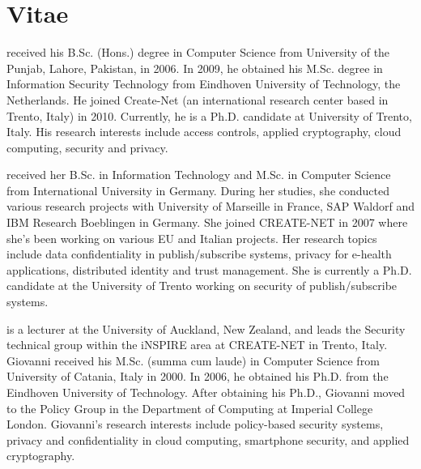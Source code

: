 \documentclass[final,5p,times,twocolumn]{elsarticle}
\begin{document}
\clearpage

\section*{Vitae}

  received his B.Sc. (Hons.) degree in Computer Science from University of the Punjab, Lahore, Pakistan, in 2006. In 2009, he obtained his M.Sc. degree in Information Security Technology from Eindhoven University of Technology, the Netherlands. He joined Create-Net (an international research center based in Trento, Italy) in 2010. Currently, he is a Ph.D. candidate at University of Trento, Italy. His research interests include access controls, applied cryptography, cloud computing, security and privacy.

 received her B.Sc. in Information Technology and M.Sc. in Computer Science from International University in Germany. During her studies, she conducted various research projects with University of Marseille in France, SAP Waldorf and IBM Research Boeblingen in Germany. She joined CREATE-NET in 2007 where she's been working on various EU and Italian projects. Her research topics include data confidentiality in publish/subscribe systems, privacy for e-health applications, distributed identity and trust management. She is currently a Ph.D. candidate at the University of Trento working on security of publish/subscribe systems.

 is a lecturer at the University of Auckland, New Zealand, and leads the Security technical group within the iNSPIRE area at CREATE-NET in Trento, Italy. Giovanni received his M.Sc. (summa cum laude) in Computer Science from University of Catania, Italy in 2000. In 2006, he obtained his Ph.D. from the Eindhoven University of Technology. After obtaining his Ph.D., Giovanni moved to the Policy Group in the Department of Computing at Imperial College London. Giovanni's research interests include policy-based security systems, privacy and confidentiality in cloud computing, smartphone security, and applied cryptography.
\end{document}
